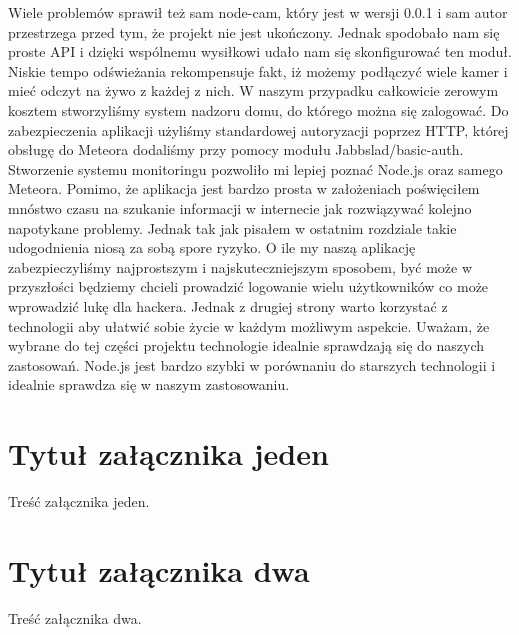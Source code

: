 \documentclass[brudnopis]{xmgr}
\begin{document}
Wiele problemów sprawił też sam node-cam, który jest w wersji 0.0.1 i sam autor przestrzega przed tym, że projekt nie jest ukończony. Jednak spodobało nam się proste API i dzięki wspólnemu wysiłkowi udało nam się skonfigurować ten moduł. 
Niskie tempo odświeżania rekompensuje fakt, iż możemy podłączyć wiele kamer i mieć odczyt na żywo z każdej z nich. W naszym przypadku całkowicie zerowym kosztem stworzyliśmy system nadzoru domu, do którego można się zalogować. Do zabezpieczenia aplikacji użyliśmy standardowej autoryzacji poprzez HTTP, której obsługę do Meteora dodaliśmy przy pomocy modułu Jabbslad/basic-auth.
\summary
Stworzenie systemu monitoringu pozwoliło mi lepiej poznać Node.js oraz samego Meteora. Pomimo, że aplikacja jest bardzo prosta w założeniach poświęciłem mnóstwo czasu na szukanie informacji w internecie jak rozwiązywać kolejno napotykane problemy. Jednak tak jak pisałem w ostatnim rozdziale takie udogodnienia niosą za sobą spore ryzyko. O ile my naszą aplikację zabezpieczyliśmy najprostszym i najskuteczniejszym sposobem, być może w przyszłości będziemy chcieli prowadzić logowanie wielu użytkowników co może wprowadzić lukę dla hackera. Jednak z drugiej strony warto korzystać z technologii aby ułatwić sobie życie w każdym możliwym aspekcie. 
Uważam, że wybrane do tej części projektu technologie idealnie sprawdzają się do naszych zastosowań. Node.js jest bardzo szybki w porównaniu do starszych technologii i idealnie sprawdza się w naszym zastosowaniu.

\appendix
\chapter{Tytuł załącznika jeden}

Treść załącznika jeden.

\chapter{Tytuł załącznika dwa}

Treść załącznika dwa.




\listoftables

\listoffigures

\oswiadczenie
\end{document}
